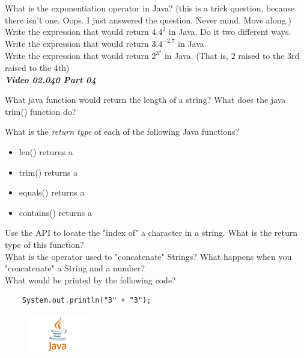 \documentclass[letterpaper,11pt]{exam}
\newcommand{\videoheading}[1]{\Large\textbf{\textit{#1}}}
\begin{document}
\begin{questions}
\question What is the exponentiation operator in Java?  (this is a trick question, because there isn't one.  Oops.  I just answered the question.  Never mind.  Move along.)
\question Write the expression that would return $4.4^2$ in Java.  Do it two different ways.
\\
\question Write the expression that would return $3.4^{-2.7}$ in Java.
\\
\question Write the expression that would return $2^{3^4}$ in Java.  (That is, 2 raised to the 3rd raised to the 4th)
\\
\videoheading{Video 02.040 Part 04}

\question What java function would return the length of a string? \makebox[2cm]{\hrulefill}
\question What does the java trim() function do?
\\
\begin{samepage}
\question What is the \textit{return type} of each of the following Java functions?
\begin{itemize}
  \item len() returns a \makebox[2cm]{\hrulefill}
  \item trim() returns a \makebox[2cm]{\hrulefill}
  \item equals() returns a \makebox[2cm]{\hrulefill}
  \item contains() returns a \makebox[2cm]{\hrulefill}
\end{itemize}
\end{samepage}
\question Use the API to locate the "index of" a character in a string.  What is the return type of this function?
\\
\question What is the operator used to "concatenate" Strings? \makebox[2cm]{\hrulefill}
\question What happens when you "concatenate" a String and a number?
\\
\question What would be printed by the following code?
\begin{verbatim}
    System.out.println("3" + "3");
\end{verbatim}









\end{questions}
\begin{figure}[b]\label{end}
	\center
	\includegraphics[width=1in]{java}
\end{figure}
\end{document}
